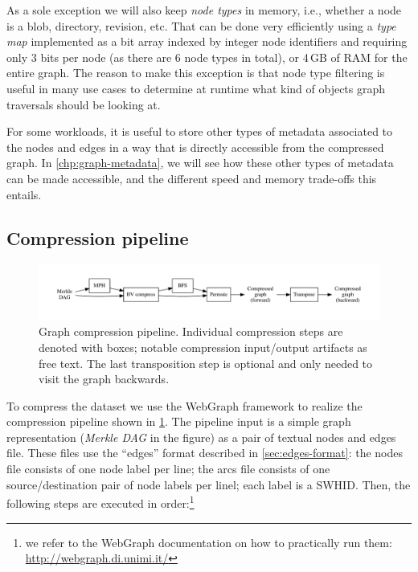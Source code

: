 As a sole exception we will also keep \emph{node types} in memory, i.e., whether
a node is a blob, directory, revision, etc. That can be done very
efficiently using a \emph{type map} implemented as a bit array indexed by
integer node identifiers and requiring only 3 bits per node (as there are 6
node types in total), or 4\,GB of RAM for the entire graph. The reason to make
this exception is that node type filtering is useful in many use cases to
determine at runtime what kind of objects graph traversals should be looking
at.

For some workloads, it is useful to store other types of metadata associated to
the nodes and edges in a way that is directly accessible from the compressed
graph.
In \cref{chp:graph-metadata}, we will see how these other types of metadata can
be made accessible, and the different speed and memory trade-offs this entails.

\subsection{Compression pipeline}%
\label{sec:compression-pipeline}

\begin{figure}
  \centering
  \includegraphics[width=\linewidth,trim=1cm 1cm 1cm 1cm]{img/compression/compression_steps-nofiles}
  \caption{Graph compression pipeline. Individual compression steps are denoted
    with boxes; notable compression input/output artifacts as free text. The
    last transposition step is optional and only needed to visit the graph
    backwards.}%
  \label{fig:compression-pipeline}
\end{figure}

To compress the dataset we use the WebGraph framework to realize the
compression pipeline shown in \cref{fig:compression-pipeline}. The
pipeline input is a simple graph representation (\emph{Merkle DAG} in the
figure) as a pair of textual nodes and edges file. These files use the
``edges'' format described in \cref{sec:edges-format}: the nodes file
consists of one node label per line; the arcs file consists of one
source/destination pair of node labels per linel; each label is a \gls{SWHID}.
Then, the following steps are executed in order:\footnote{we refer to the
WebGraph documentation on how to practically run them:
\url{http://webgraph.di.unimi.it/}}

